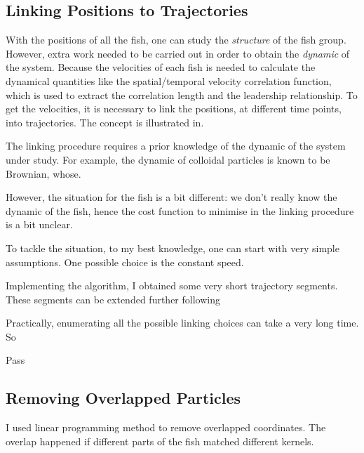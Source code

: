 \documentclass[11pt,twoside]{report}
\begin{document}
\subsection{Linking Positions to Trajectories}
\label{section:link}

With the positions of all the fish, one can study the \emph{structure} of the fish group. However, extra work needed to be carried out in order to obtain the \emph{dynamic} of the system. Because the velocities of each fish is needed to calculate the dynamical quantities like the spatial/temporal velocity correlation function, which is used to extract the correlation length and the leadership relationship. To get the velocities, it is necessary to link the positions, at different time points, into trajectories. The concept is illustrated in.


The linking procedure requires a prior knowledge of the dynamic of the system under study. For example, the dynamic of colloidal particles is known to be Brownian, whose.


However, the situation for the fish is a bit different: we don't really know the dynamic of the fish, hence the cost function to minimise in the linking procedure is a bit unclear.

To tackle the situation, to my best knowledge, one can start with very simple assumptions. One possible choice is the constant speed.


Implementing the algorithm, I obtained some very short trajectory segments. These segments can be extended further following


Practically, enumerating all the possible linking choices can take a very long time. So


Pass


\subsection{Removing Overlapped Particles}
\label{section:overlap}

I used linear programming method to remove overlapped coordinates. The overlap happened if different parts of the fish matched different kernels.
\end{document}
